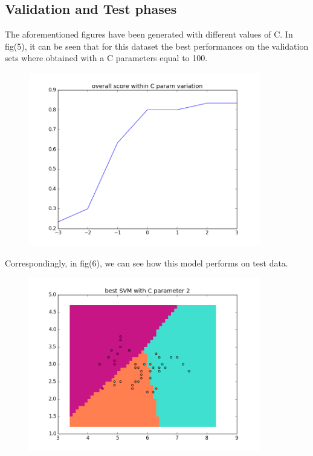 \documentclass{article}
\begin{document}
\subsection{Validation and Test phases}
				The aforementioned figures have been generated with different values of C.
				In fig(5), it can be seen that for this dataset the best performances on the validation sets where obtained with a C parameters equal to 100.
\begin{center}
\begin{figure}
\centering
\includegraphics[width=0.9\textwidth]{figure_8}
\caption{}
\label{fig:5}
\end{figure}
\end{center}
				Correspondingly, in fig(6), we can see how this model performs on test data.
\begin{center}
\begin{figure}
\centering
\includegraphics[width=0.9\textwidth]{figure_9}
\caption{}
\label{fig:6}
\end{figure}
\end{center}
\newpage
				
\end{document}
